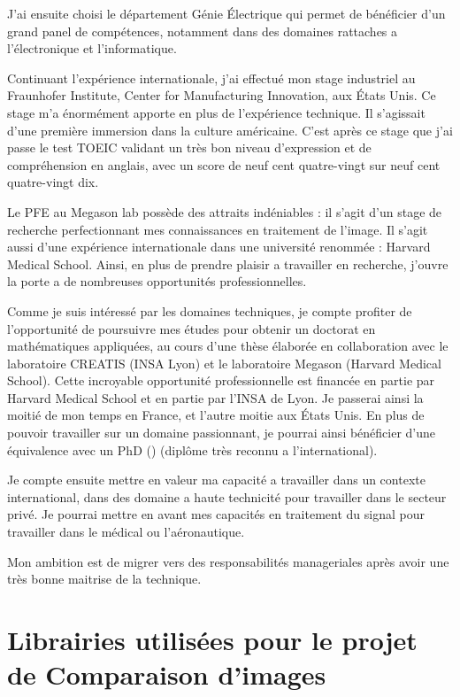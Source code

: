 J'ai ensuite choisi le département Génie Électrique qui permet de bénéficier d'un grand panel de compétences, notamment dans des domaines rattaches a l'électronique et l'informatique.

Continuant l'expérience internationale, j'ai effectué mon stage industriel au Fraunhofer Institute, Center for Manufacturing Innovation, aux États Unis. Ce stage m'a énormément apporte en plus de l'expérience technique. Il s'agissait d'une première immersion dans la culture américaine. C'est après ce stage que j'ai passe le test TOEIC validant un très bon niveau d'expression et de compréhension en anglais, avec un score de neuf cent quatre-vingt sur neuf cent quatre-vingt dix.

Le PFE au Megason lab possède des attraits indéniables : il s'agit d'un stage de recherche perfectionnant mes connaissances en traitement de l'image. Il s'agit aussi d'une expérience internationale dans une université renommée : Harvard Medical School. Ainsi, en plus de prendre plaisir a travailler en recherche, j'ouvre la porte a de nombreuses opportunités professionnelles.

Comme je suis intéressé par les domaines techniques, je compte profiter de l'opportunité de poursuivre mes études pour obtenir un doctorat en mathématiques appliquées, au cours d'une thèse élaborée en collaboration avec le laboratoire CREATIS (INSA Lyon) et le laboratoire Megason (Harvard Medical School). Cette incroyable opportunité professionnelle est financée en partie par Harvard Medical School et en partie par l'INSA de Lyon. Je passerai ainsi la moitié de mon temps en France, et l'autre moitie aux États Unis.
En plus de pouvoir travailler sur un domaine passionnant, je pourrai ainsi bénéficier d'une équivalence avec un PhD () (diplôme très reconnu a l'international). 

Je compte ensuite mettre en valeur ma capacité a travailler dans un contexte international, dans des domaine a haute technicité pour travailler dans le secteur privé. Je pourrai mettre en avant mes capacités en traitement du signal pour travailler dans le médical ou l'aéronautique.

Mon ambition est de migrer vers des responsabilités manageriales après avoir une très bonne maitrise de la technique.





\appendix


\chapter{Librairies utilisées pour le projet de Comparaison d'images}


